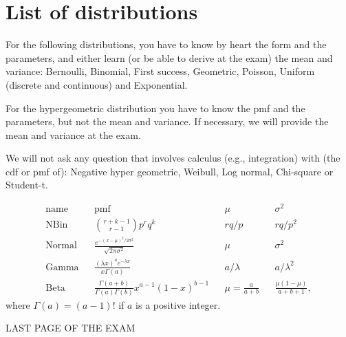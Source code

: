 \documentclass[12pt]{article}
\theoremstyle{definition}
\newcommand{\1}[1]{\,I_{#1}} %
\begin{document}
\section*{List of distributions}

For the following distributions, you have to know by heart the form and the parameters, and either learn (or be able to derive at the exam) the mean and variance: Bernoulli, Binomial, First success, Geometric, Poisson, Uniform (discrete and continuous) and Exponential.

For the hypergeometric distribution you have to know the pmf and the parameters, but not the mean and variance. If necessary, we will provide the mean and variance at the exam.

We will not ask any question that involves calculus (e.g., integration) with (the cdf or pmf of):
Negative hyper geometric, Weibull, Log normal, Chi-square or Student-t.

\begin{align*}
\text{name} && \text{pmf} && \mu && \sigma^{2} \\
\text{NBin} && {r+k-1 \choose r-1}p^r q^k && rq/p && rq/p^2\\
\text{Normal} && \frac{e^{-(x-\mu)^2/2\sigma^{2}}}{\sqrt{2\pi\sigma^{2}}} && \mu && \sigma^{2}\\
\text{Gamma} &&  \frac{(\lambda x)^a e^{-\lambda x}}{x \Gamma(a)} && a/\lambda && a/\lambda^2\\
\text{Beta} && \frac{\Gamma(a+b)}{\Gamma(a) \Gamma(b)} x^{a-1} (1-x)^{b-1} && \mu=\frac a{a+b} && \frac{\mu(1-\mu)}{a+b+1},
\end{align*}
where \(\Gamma(a) = (a-1)!\) if \(a\) is a positive integer.


\vfill
\begin{center}
LAST PAGE OF THE EXAM
\end{center}
\end{document}

